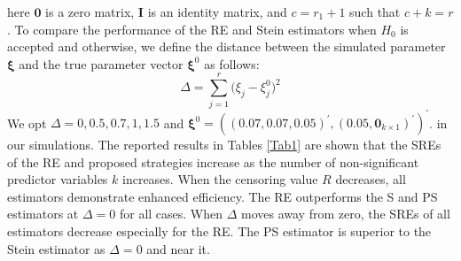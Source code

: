 \documentclass[twoside]{article}
\begin{document}
here
$ \boldsymbol{0} $
is a zero matrix,
$ \boldsymbol{I} $
is an identity matrix, and
$ c = r_1 + 1 $ 
such that
$ c + k = r $.
To compare the performance of the RE and Stein estimators when 
$ H_0 $
is accepted and otherwise, we define the distance between the simulated parameter
$ \boldsymbol{\xi} $
and the true parameter vector
$ \boldsymbol{\xi}^{0} $
as follows:
\begin{equation*}
\Delta = \sum_{ j = 1 }^r \big ( \xi_j - \xi_j^{0} \big )^2
\end{equation*}
We opt 
$ \Delta =  0, 0.5, 0.7, 1, 1.5  $
and
$ \boldsymbol{\xi}^{0} = ( ( 0.07, 0.07, 0.05 )^\prime, ( 0.05 , \boldsymbol{0}_{ k \times 1 } )^\prime )^\prime $.
in our simulations. The reported results in Tables \ref{Tab1} are shown that the SREs of the RE and proposed strategies increase as the number of non-significant predictor variables
$ k $
increases. When the censoring value 
$ R $
decreases, all estimators demonstrate enhanced efficiency. The RE outperforms the S and PS estimators at 
$ \Delta = 0 $ 
for all cases. When 
$ \Delta $
moves away from zero, the SREs of all estimators decrease especially for the RE. The PS estimator is superior to the Stein estimator as 
$ \Delta = 0 $ 
and near it.
\end{document}
